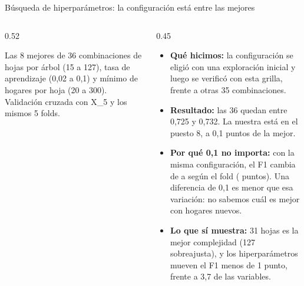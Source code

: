 \documentclass[aspectratio=169, 10pt]{beamer}
\begin{document}
\begin{frame}{B\'usqueda de hiperpar\'ametros: la configuraci\'on est\'a entre las mejores}
  \begin{columns}[c, onlytextwidth]
    \begin{column}{0.52\textwidth}
      \centering
      \resizebox{\linewidth}{!}{}
      \par\smallskip
      {\scriptsize\color{black!60} Las 8 mejores de 36 combinaciones de hojas por \'arbol (15 a 127), tasa de aprendizaje (0,02 a 0,1) y m\'inimo de hogares por hoja (20 a 300). Validaci\'on cruzada con X\_5 y los mismos 5 folds.\par}
    \end{column}
    \begin{column}{0.45\textwidth}
      \footnotesize
      \begin{itemize}
        \item \textbf{Qu\'e hicimos:} la configuraci\'on se eligi\'o con una exploraci\'on inicial y luego se verific\'o con esta grilla, frente a otras 35 combinaciones.
        \item \textbf{Resultado:} las 36 quedan entre 0,725 y 0,732. La nuestra est\'a en el puesto 8, a 0,1 puntos de la mejor.
        \item \textbf{Por qu\'e 0,1 no importa:} con la misma configuraci\'on, el F1 cambia de \FoneFoldMin{} a \FoneFoldMax{} seg\'un el fold (\FoneFoldRango{} puntos). Una diferencia de 0,1 es menor que esa variaci\'on: no sabemos cu\'al es mejor con hogares nuevos.
        \item \textbf{Lo que s\'i muestra:} 31 hojas es la mejor complejidad (127 sobreajusta), y los hiperpar\'ametros mueven el F1 menos de 1 punto, frente a 3,7 de las variables.
      \end{itemize}
    \end{column}
  \end{columns}
\end{frame}
\end{document}
